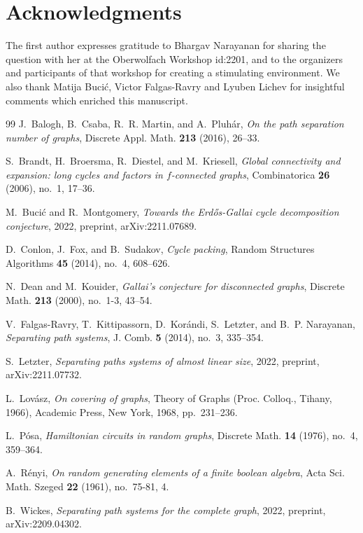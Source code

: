 \section*{Acknowledgments}

The first author expresses gratitude to Bhargav Narayanan for sharing the question with her at the Oberwolfach Workshop id:2201, and to the organizers and participants of that workshop for creating a stimulating environment.
We also thank Matija Buci\'c, Victor Falgas-Ravry and Lyuben Lichev for insightful comments which enriched this manuscript.


\begin{thebibliography}{99}
J.~Balogh, B.~Csaba, R.~R. Martin, and A.~Pluh\'{a}r, \emph{On the path
  separation number of graphs}, Discrete Appl. Math. \textbf{213} (2016),
  26--33.

S.~Brandt, H.~Broersma, R.~Diestel, and M.~Kriesell, \emph{Global connectivity
  and expansion: long cycles and factors in {$f$}-connected graphs},
  Combinatorica \textbf{26} (2006), no.~1, 17--36.

M.~Buci{\'c} and R.~Montgomery, \emph{Towards the {E}rd{\H{o}}s-{G}allai cycle
  decomposition conjecture}, 2022, preprint, arXiv:2211.07689.

D.~Conlon, J.~Fox, and B.~Sudakov, \emph{Cycle packing}, Random Structures
  Algorithms \textbf{45} (2014), no.~4, 608--626.

N.~Dean and M.~Kouider, \emph{Gallai's conjecture for disconnected graphs},
  Discrete Math. \textbf{213} (2000), no.~1-3, 43--54.

V.~Falgas-Ravry, T.~Kittipassorn, D.~Kor\'{a}ndi, S.~Letzter, and B.~P.
  Narayanan, \emph{Separating path systems}, J. Comb. \textbf{5} (2014), no.~3,
  335--354.

S.~Letzter, \emph{Separating paths systems of almost linear size}, 2022,
  preprint, arXiv:2211.07732.

L.~Lov\'{a}sz, \emph{On covering of graphs}, Theory of {G}raphs ({P}roc.
  {C}olloq., {T}ihany, 1966), Academic Press, New York, 1968, pp.~231--236.

L.~P\'{o}sa, \emph{Hamiltonian circuits in random graphs}, Discrete Math.
  \textbf{14} (1976), no.~4, 359--364.

A.~R{\'e}nyi, \emph{On random generating elements of a finite boolean algebra},
  Acta Sci. Math. Szeged \textbf{22} (1961), no.~75-81, 4.

B.~Wickes, \emph{Separating path systems for the complete graph}, 2022,
  preprint, arXiv:2209.04302.

\end{thebibliography}